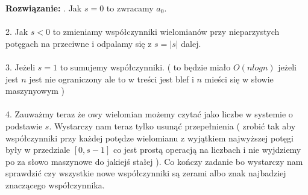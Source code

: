 \textbf{Rozwiązanie:}
\newline
{}. Jak $s = 0$ to zwracamy $a_0$. \\ \\
2. Jak $s < 0$ to zmieniamy współczynniki wielomianów przy nieparzystych potęgach na przeciwne i odpalamy się z $s = |s|$ dalej. \\ \\
3. Jeżeli $s = 1$ to sumujemy współczynniki. ( to będzie miało $O(n log n)$ jeżeli jest $n$ jest nie ograniczony ale to w treści jest blef i $n$ mieści się w słowie maszynyowym ) \\ \\
4. Zauważmy teraz że owy wielomian możemy czytać jako liczbe w systemie o podstawie $s$. Wystarczy nam teraz tylko usunąć przepełnienia ( zrobić tak aby współczynniki przy każdej potędze wielomianu z wyjątkiem najwyższej potęgi były w przedziale $[0,s-1]$ co jest prostą operacją na liczbach i nie wyjdziemy po za słowo maszynowe do jakiejś stałej ). Co kończy zadanie bo wystarczy nam sprawdzić czy wszystkie nowe współczynniki są zerami albo znak najbadziej znaczącego współczynnika.